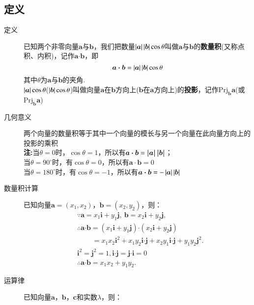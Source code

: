 \begin{Theorem}[平面向量基本定理]
  \subsection{定义}
    \begin{description}
      \item[定义] 已知两个非零向量$ \bm{a} $与$\bm{b}$，我们把数量$ \left| \bm{a} \right|\left| \bm{b} \right|\cos\theta $叫做$ \bm{a} $与$ \bm{b} $的\textbf{数量积}(又称点积、内积)，记作$ \bm{a}\bm{\cdot}\bm{b} $，即\[\bm{a}\bm{\cdot}\bm{b}=\left| \bm{a} \right|\left| \bm{b} \right|\cos\theta\]
      其中$ \theta $为$ \bm{a} $与$ \bm{b} $的夹角.\\
      $\left| \bm{a} \right|\cos\theta$($\left| \bm{b} \right|\cos\theta$)叫做向量$\bm a$在$\bm b$方向上($\bm b$在$\bm a$方向上)的\textbf{投影}，记作$\mathrm{Prj}_{\bm b}{\bm a}$(或$\mathrm{Prj}_{\bm b}{\bm a}$)
      \item[几何意义] 两个向量的数量积等于其中一个向量的模长与另一个向量在此向量方向上的投影的乘积\\%
      {\kaishu \textbf{注:}当$ \theta=0 $时，$ \cos\theta=1 $，所以有$ \bm{a\cdot b}=\bm{\left| a \right|\left| b \right|} $；\\\phantom{注:\ }当$ \theta=90^{\circ} $时，有$ \cos\theta =0$，所以有$ \bm{a\cdot b}=0 $ \\\phantom{注:\ }当$ \theta=180^{\circ} $时，有$ \cos\theta =-1$，所以有$ \bm{a\cdot b}=-\left| \bm{a} \right|\left| \bm{b} \right| $}
      \item[数量积计算]已知向量$\bm a=(x_1,x_2)$，$\bm b=(x_2,y_2)$，则：
      \begin{equation*}
      \begin{aligned}
        &\because \bm{a}=x_1\bm{i}+y_1\bm{j},~\bm{b}=x_2\bm{i}+y_2\bm{j},\\
        &\therefore \bm{a}\bm{\cdot}\bm{b}=(x_1\bm{i}+y_1\bm{j})\bm{\cdot}(x_2\bm{i}+y_2\bm{j})\\
        &\phantom{\therefore\bm{a}\bm{\cdot}\bm{b}~}=x_1x_2\bm{i}^2+x_1y_2\bm{i}\bm{\cdot}\bm{j}+x_2y_1\bm{i}\bm{\cdot}\bm{j}+y_1y_2\bm{j}^2.\\
        & \bm{i}^2=\bm{j}^2=1,\bm{i}\bm{\cdot}\bm{j}=\bm{j}\bm{\cdot}\bm{i}=0\\
        &\therefore \bm{a}\bm{\cdot}\bm{b}=x_1x_2+y_1y_2.
      \end{aligned}
      \end{equation*}
      \item[运算律] 已知向量$\bm a$，$\bm b$，$\bm c$和实数$\lambda$，则：

\end{description}
\end{Theorem}
